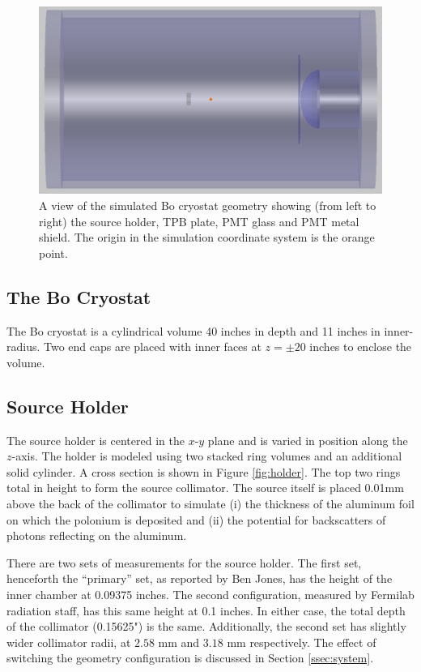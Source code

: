 \documentclass[aps,pra,notitlepage,groupedaddress]{revtex4-1}
\begin{document}
\begin{figure}
	\includegraphics[width=1.0\textwidth]{figures/geo_overview}
	\caption{A view of the simulated Bo cryostat geometry showing (from left to right) the source holder, TPB plate, PMT glass and PMT metal shield. The origin in the simulation coordinate system is the orange point. \label{fig:geo}}
\end{figure}

\subsection{The Bo Cryostat}

The Bo cryostat is a cylindrical volume 40 inches in depth and 11 inches in inner-radius. Two end caps are placed with inner faces at $z=\pm 20$ inches to enclose the volume. 

\subsection{Source Holder}

The source holder is centered in the $x$-$y$ plane and is varied in position along the $z$-axis. The holder is modeled using two stacked ring volumes and an additional solid cylinder. A cross section is shown in Figure \ref{fig:holder}. The top two rings total in height to form the source collimator. The source itself is placed 0.01mm above the back of the collimator to simulate (i) the thickness of the aluminum foil on which the polonium is deposited and (ii) the potential for backscatters of photons reflecting on the aluminum.

There are two sets of measurements for the source holder. The first set, henceforth the ``primary'' set, as reported by Ben Jones, has the height of the inner chamber at 0.09375 inches. The second configuration, measured by Fermilab radiation staff, has this same height at 0.1 inches. In either case, the total depth of the collimator (0.15625") is the same. Additionally, the second set has slightly wider collimator radii, at $2.58$ mm and $3.18$ mm respectively. The effect of switching the geometry configuration is discussed in Section \ref{ssec:system}.
\end{document}
